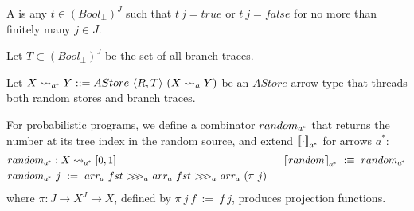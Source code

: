 \documentclass{llncs}
\newcommand{\arrow}{\rightsquigarrow}
\newcommand{\acomp}{\ensuremath{{>}\mspace{-6mu}{>}\mspace{-6mu}{>}}}
\newcommand{\gen}{_a}
\newcommand{\genc}{_{a^{\mspace{-2mu}*}}}
\begin{document}
\begin{definition}
A  is any $t \in (Bool_\bot)^J$ such that $t~j = true$ or $t~j = false$ for no more than finitely many $j \in J$.

Let $T \subset (Bool_\bot)^J$ be the set of all branch traces.
\end{definition}

Let $X \arrow\genc Y ::= AStore~\pair{R,T}~(X \arrow\gen Y)$ be an $AStore$ arrow type that threads both random stores and branch traces.

For probabilistic programs, we define a combinator $random\genc$ that returns the number at its tree index in the random source, and extend $\meaningof{\cdot}\genc$ for arrows $a^*$:
\begin{equation}
\begin{aligned}
	&\begin{aligned}[t]
		&random\genc : X \arrow\genc [0,1] \\
		&random\genc~j \ := \ arr\gen~fst~\acomp\gen~arr\gen~fst~\acomp\gen~arr\gen~(\pi~j)
	\end{aligned}
&\ \ 
	\meaningof{random}\genc \ :\equiv \ random\genc
\end{aligned}
\label{eqn:random-def}
\end{equation}
where $\pi : J \to X^J \to X$, defined by $\pi~j~f \ := \ f~j$, produces projection functions.
\end{document}
